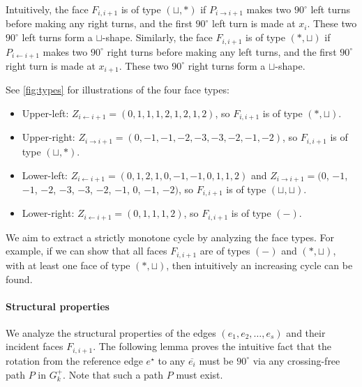 \documentclass{article}\usepackage[a4paper,margin=20mm]{geometry}
\newcommand{\Nsouth}{\mathcal{N}_\mathsf{south}}
\newcommand{\eref}{e^\star}
\begin{document}



Intuitively, the face $F_{i,i+1}$ is of type $(\sqcup, \ast)$ if $P_{i \rightarrow i+1}$ makes two $90^\circ$ left turns before making any right turns, and the first $90^\circ$ left turn is made at $x_{i}$. These two $90^\circ$ left turns form a $\sqcup$-shape.
Similarly, the face $F_{i,i+1}$ is of type $(\ast, \sqcup)$ if ${P_{i \leftarrow i+1}}$ makes two $90^\circ$ right turns before making any left turns, and the first $90^\circ$ right turn is made at $x_{i+1}$.  These two $90^\circ$ right turns form a $\sqcup$-shape.


See \cref{fig:types} for illustrations of the four face types:
\begin{itemize}
    \item Upper-left: $Z_{i\leftarrow i+1}=(0,1,1,1,2,1,2,1,2)$, so $F_{i,i+1}$ is of type $(\ast,\sqcup)$.  
    \item Upper-right: $Z_{i\rightarrow i+1}=(0,-1,-1,-2,-3,-3,-2,-1,-2)$, so $F_{i,i+1}$ is of type $(\sqcup,\ast)$. 
    \item Lower-left: $Z_{i\leftarrow i+1}=(0,1,2,1,0,-1,-1,0,1,1,2)$ and $Z_{i\rightarrow i+1}=(0$, $-1$, $-1$, $-2$, $-3$, $-3$, $-2$, $-1$, $0$, $-1$, $-2)$, so $F_{i,i+1}$ is of type $(\sqcup,\sqcup)$.  
    \item Lower-right: $Z_{i\leftarrow i+1}=(0,1,1,1,2)$, so $F_{i,i+1}$ is of type $(-)$. 
\end{itemize}

We aim to extract a strictly monotone cycle by analyzing the face types. For example, if we can show that all faces $F_{i,i+1}$ are of types $(-)$ and $(\ast,\sqcup)$, with at least one face of type $(\ast,\sqcup)$, then intuitively an increasing cycle can be found.


\paragraph{Structural properties}
We analyze the structural properties of the edges $(e_1, e_2, \ldots, e_s)$ and their incident faces $F_{i,i+1}$. The following lemma proves the intuitive fact that the rotation from the reference edge $\eref$ to any $\overline{e_i}$ must be $90^\circ$ via any crossing-free path $P$ in $G_k^+$.
Note that such a path $P$ must exist.
\end{document}

